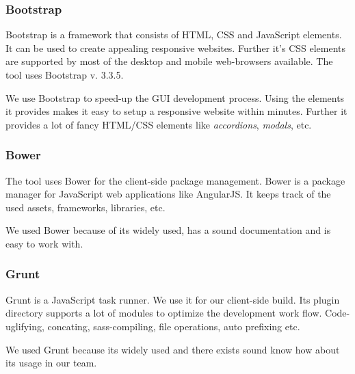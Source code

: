 \subsubsection{Bootstrap}
Bootstrap is a framework that consists of HTML, CSS and JavaScript elements. It can be used to create appealing responsive websites. Further it's CSS elements are supported by most of the desktop and mobile web-browsers available. The tool uses Bootstrap v. 3.3.5. \cite{bootstrap}\par
We use Bootstrap to speed-up the GUI development process. Using the elements it provides makes it easy to setup a responsive website within minutes. Further it provides a lot of fancy HTML/CSS elements like \textit{accordions}, \textit{modals}, etc.

\subsubsection{Bower}
The tool uses Bower for the client-side package management. Bower is a package manager for JavaScript web applications like AngularJS. It keeps track of the used assets, frameworks, libraries, etc. \cite{bower} \par
We used Bower because of its widely used, has a sound documentation and is easy to work with.

\subsubsection{Grunt}
Grunt is a JavaScript task runner. We use it for our client-side build. Its plugin directory supports a lot of modules to optimize the development work flow. Code-uglifying, concating, sass-compiling, file operations, auto prefixing etc. \cite{grunt} \par
We used Grunt because its widely used and there exists sound know how about its usage in our team.
